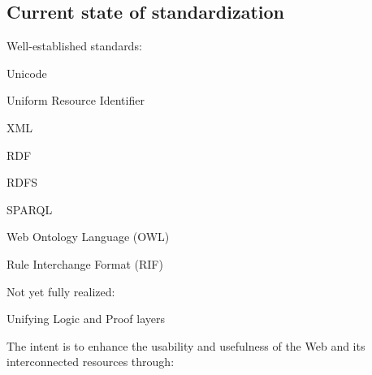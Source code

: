 \subsection{Current state of standardization}

Well-established standards:

\begin{compactitem}
\item Unicode
\item Uniform Resource Identifier
\item XML
\item RDF
\item RDFS
\item SPARQL
\item Web Ontology Language (OWL)
\item Rule Interchange Format (RIF)
\end{compactitem}

Not yet fully realized:

\begin{compactitem}
\item Unifying Logic and Proof layers
\end{compactitem}

The intent is to enhance the usability and usefulness of the Web and its interconnected resources through:

